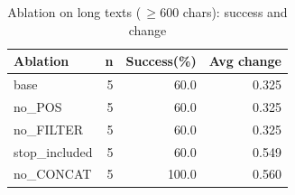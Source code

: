 \begin{table}[H]
  \centering
  \caption{Ablation on long texts (\,$\geq$600 chars): success and change}
  \begin{tabular}{lrrr}
    \toprule
    Ablation & n & Success(\%) & Avg change \\
    \midrule
    base & 5 & 60.0 & 0.325 \\
    no\_POS & 5 & 60.0 & 0.325 \\
    no\_FILTER & 5 & 60.0 & 0.325 \\
    stop\_included & 5 & 60.0 & 0.549 \\
    no\_CONCAT & 5 & 100.0 & 0.560 \\
    \bottomrule
  \end{tabular}
\end{table}